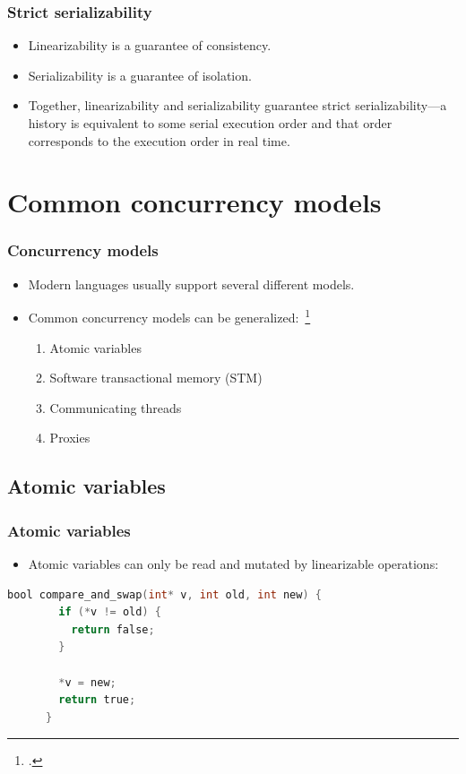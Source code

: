 \documentclass{beamer}
\begin{document}
  \begin{frame}
    \frametitle{Strict serializability}

    \begin{itemize}
      \item Linearizability is a guarantee of consistency.
      \item Serializability is a guarantee of isolation.
      \item Together, linearizability and serializability guarantee strict serializability---a history is equivalent to some serial execution order and that order corresponds to the execution order in real time.
    \end{itemize}
  \end{frame}

  \section{Common concurrency models}

  \begin{frame}
    \frametitle{Concurrency models}

    \begin{itemize}
      \item Modern languages usually support several different models.
      \item Common concurrency models can be generalized:~\footcite{Swalens2014}
      \begin{enumerate}
        \item Atomic variables
        \item Software transactional memory (STM)
        \item Communicating threads
        \item Proxies
      \end{enumerate}
    \end{itemize}
  \end{frame}

  \subsection{Atomic variables}

  \begin{frame}[fragile]
    \frametitle{Atomic variables}

    \begin{itemize}
      \item Atomic variables can only be read and mutated by linearizable operations:
    \end{itemize}

    \begin{lstlisting}[basicstyle=\scriptsize\ttfamily,language=C]
      bool compare_and_swap(int* v, int old, int new) {
        if (*v != old) {
          return false;
        }

        *v = new;
        return true;
      }
    \end{lstlisting}

\end{frame}
\end{document}

